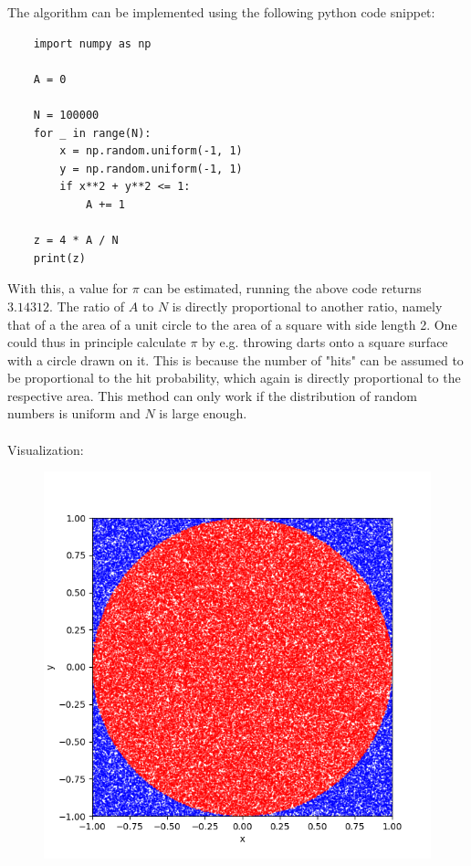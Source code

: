 The algorithm can be implemented using the following python code snippet: \\
\begin{lstlisting}
    import numpy as np
    
    A = 0
    
    N = 100000
    for _ in range(N):
        x = np.random.uniform(-1, 1)
        y = np.random.uniform(-1, 1)
        if x**2 + y**2 <= 1:
            A += 1
    
    z = 4 * A / N
    print(z) \end{lstlisting}
With this, a value for $\pi$ can be estimated, running the above code 
returns $3.14312$. The ratio of $A$ to $N$ is 
directly proportional to another ratio, namely that of a the area of a 
unit circle to the area of a square with side length 2. One could thus 
in principle calculate $\pi$ by e.g. throwing darts onto a square surface with 
a circle drawn on it. This is because the number of "hits" can be 
assumed to be proportional to the hit probability, which again is directly 
proportional to the respective area. This method can only work if the 
distribution of random numbers is uniform and $N$ is large enough. \\
\\
Visualization:
\begin{figure}[h!]
    \centering
    \includegraphics[width=.6\textwidth]{./figures/task_03_N100000.png}
\end{figure} \ \\ 

